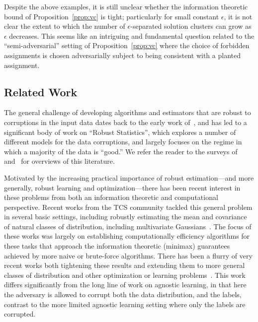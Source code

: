 \documentclass[anon,12pt]{colt2018}
\newcommand{\eps}{\epsilon}
\begin{document}
Despite the above examples, it is still unclear whether the information theoretic bound of Proposition~\ref{prop:vc} is tight; particularly for small constant $\eps$, it is not clear the extent to which the number of $\eps$-separated solution clusters can grow as $\eps$ decreases.  This seems like an intriguing and fundamental question related to the ``semi-adversarial'' setting of Proposition~\ref{prop:vc} where the choice of forbidden assignments is chosen adversarially subject to being consistent with a planted assignment.

\subsection{Related Work}

The general challenge of developing algorithms and estimators that are robust to corruptions in the input data dates back to the early work of~\cite{tukey1960survey}, and has led to a significant body of work on  ``Robust Statistics'', which explores a number of different models for the data corruptions, and largely focuses on the regime in which a majority of the data is ``good.''   We refer the reader to the surveys of~\cite{huber2011robust} and~\cite{hampel2011robust} for overviews of this literature.

Motivated by the increasing practical importance of robust estimation---and more generally, robust learning and optimization---there has been recent interest in these problems from both an information theoretic and computational perspective.   Recent works from the TCS community tackled this general problem in several basic settings, including robustly estimating the mean and covariance of natural classes of distribution, including multivariate Gaussians~\cite{diakonikolas2016robust,lai2016agnostic}.   The focus of these works was largely on establishing computationally efficiency algorithms for these tasks that approach the information theoretic (minimax) guarantees achieved by more naive or brute-force algorithms.  There has been a flurry of very recent works both tightening these results and extending them to more general classes of distribution and other optimization or learning problems~\cite{steinhardt2018resilience,kothari2017better,kothari2017outlier,diakonikolas2017learning}.   This work differs significantly from the long line of work on agnostic learning, in that here the adversary is allowed to corrupt both the data distribution, and the labels, contrast to the more limited agnostic learning setting where only the labels are corrupted.
\end{document}
